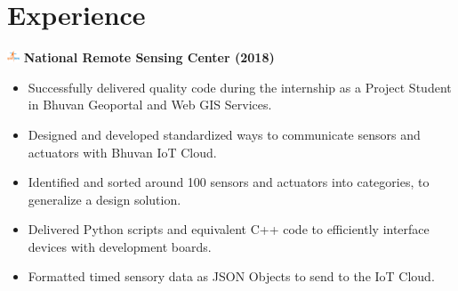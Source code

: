 \documentclass{article}
\begin{document}
\section*{Experience}
\includegraphics[width=14px]{isro.png} \textbf{National Remote Sensing Center (2018)}
\begin{itemize}
\item \small Successfully delivered quality code during the internship as a Project Student in Bhuvan Geoportal and Web GIS Services.
\item \small Designed and developed standardized ways to communicate sensors and actuators with Bhuvan IoT Cloud.
\item \small Identified and sorted around 100 sensors and actuators into categories, to generalize a design solution.
\item \small Delivered Python scripts and equivalent C++ code to efficiently interface devices with development boards.
\item \small Formatted timed sensory data as JSON Objects to send to the IoT Cloud.
\end{itemize}
\end{document}
